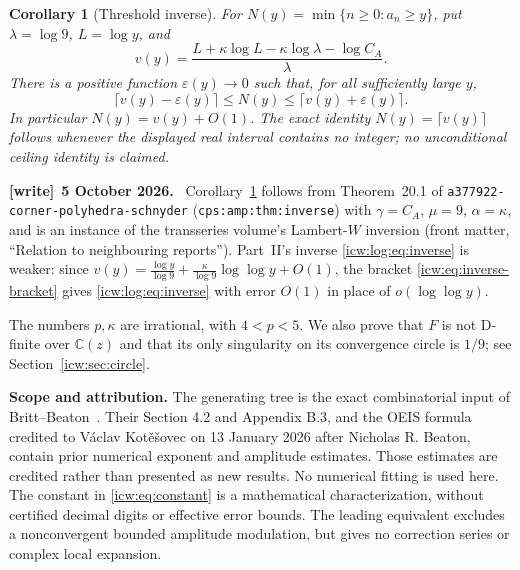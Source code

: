 \documentclass[11pt,letterpaper]{article}
\newtheorem{corollary}[theorem]{Corollary}
\theoremstyle{remark}\newtheorem{remark}[theorem]{Remark}
\newcommand{\CC}{\mathbb C}
\newcommand{\eps}{\varepsilon}
\newcommand{\1}{\mathbf1}
\newenvironment{writenote}[1][]{\par\smallskip\begingroup\small
 \noindent\textbf{[write]}\if\relax\detokenize{#1}\relax\else~\textbf{#1.}\fi\ }%
 {\par\endgroup\smallskip}
\newcommand{\file}[1]{\textup{\nolinkurl{#1}}}
\begin{document}
\begin{corollary}[Threshold inverse]\label{icw:cor:inverse}
For $N(y)=\min\{n\ge0:a_n\ge y\}$, put $\lambda=\log9$, $L=\log y$,
and
\begin{equation}\label{icw:eq:center}
 v(y)=\frac{L+\kappa\log L-\kappa\log\lambda-\log C_A}{\lambda}.
\end{equation}
There is a positive function $\eps(y)\to0$ such that, for all sufficiently
large $y$,
\begin{equation}\label{icw:eq:inverse-bracket}
 \lceil v(y)-\eps(y)\rceil\le N(y)\le
 \lceil v(y)+\eps(y)\rceil.
\end{equation}
In particular $N(y)=v(y)+O(1)$. The exact identity
$N(y)=\lceil v(y)\rceil$ follows whenever the displayed real interval
contains no integer; no unconditional ceiling identity is claimed.
\end{corollary}
\begin{writenote}[5 October 2026]
Corollary~\ref{icw:cor:inverse} follows from Theorem~20.1 of \file{a377922-corner-polyhedra-schnyder} (\texttt{cps:amp:thm:inverse}) with $\gamma=C_A$, $\mu=9$, $\alpha=\kappa$, and is an instance of the transseries volume's Lambert-$W$ inversion (front matter, ``Relation to neighbouring reports''). Part~II's inverse \eqref{icw:log:eq:inverse} is weaker: since $v(y)=\frac{\log y}{\log9}+\frac\kappa{\log9}\log\log y+O(1)$, the bracket \eqref{icw:eq:inverse-bracket} gives \eqref{icw:log:eq:inverse} with error $O(1)$ in place of $o(\log\log y)$.
\end{writenote}

The numbers $p,\kappa$ are irrational, with $4<p<5$. We also prove
that $F$ is not D-finite over $\CC(z)$ and that its only singularity
on its convergence circle is $1/9$; see Section~\ref{icw:sec:circle}.

\textbf{Scope and attribution.}
The generating tree is the exact combinatorial input of
Britt--Beaton~\cite[Section 2.5, equation (2.44)]{bb}.
Their Section 4.2 and Appendix B.3, and the OEIS formula credited to
V\'aclav Kot\v{e}\v{s}ovec on 13 January 2026 after Nicholas R. Beaton,
contain prior numerical exponent and amplitude estimates. Those estimates
are credited rather than presented as new results. No numerical fitting
is used here. The constant in \eqref{icw:eq:constant} is a mathematical
characterization, without certified decimal digits or effective error
bounds. The leading equivalent excludes a nonconvergent bounded amplitude
modulation, but gives no correction series or complex local expansion.
\end{document}

